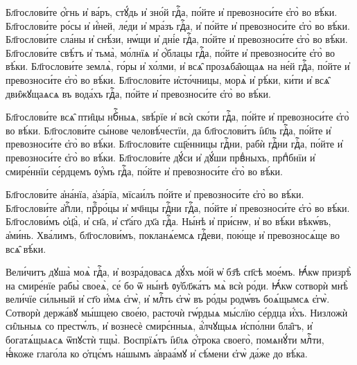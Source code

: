\hKv Бл҃гослови́те ѻ҆́гнь и҆ ва́ръ, стꙋ́дь и҆  зно́й гдⷭ҇а, по́йте и҆ превозноси́те є҆го̀ во вѣ́ки. 
\hKv  Бл҃гослови́те ро́сы и҆ и҆́ней, ле́ди и҆ мра́зъ гдⷭ҇а, и҆  по́йте и҆ превозноси́те є҆го̀ во вѣ́ки. 
\hKv Бл҃гослови́те  сла́ны и҆ снѣ́зи, нѡ́щи и҆ дні́е гдⷭ҇а, по́йте и҆  превозноси́те є҆го̀ во вѣ́ки. 
\hKv Бл҃гослови́те свѣ́тъ  и҆ тьма̀, мо́лнїѧ и҆ ѻ҆́блацы гдⷭ҇а, по́йте и҆  превозноси́те є҆го̀ во вѣ́ки. 
\hKv Бл҃гослови́те землѧ̀,  го́ры и҆ хо́лми, и҆ всѧ̑   прозѧба̑ющаѧ на не́й гдⷭ҇а, по́йте и҆ превозноси́те є҆го̀  во вѣ́ки. 
\hKv Бл҃гослови́те и҆сто́чницы, морѧ̀ и҆  рѣ́ки, ки́ти и҆ всѧ̑ дви̑жꙋщаѧсѧ въ вода́хъ гдⷭ҇а, по́йте  и҆ превозноси́те є҆го̀ во вѣ́ки. 
%

\hKv Бл҃гослови́те всѧ̑ пти̑цы нбⷭ҇ныѧ, ѕвѣ́рїе и҆  всѝ ско́ти гдⷭ҇а, по́йте и҆ превозноси́те є҆го̀ во вѣ́ки.  
\hKv Бл҃гослови́те сы́нове человѣ́честїи, да  бл҃гослови́тъ і҆и҃ль гдⷭ҇а, по́йте и҆ превозноси́те є҆го̀  во вѣ́ки. 
\hKv Бл҃гослови́те сщ҃е́нницы гдⷭ҇ни, рабѝ  гдⷭ҇ни гдⷭ҇а, по́йте и҆ превозноси́те є҆го̀ во вѣ́ки.  
\hKv Бл҃гослови́те дꙋ́си и҆ дꙋ́ши првⷣныхъ, прпⷣбнїи и҆  смире́ннїи се́рдцемъ ᲂу҆́мъ гдⷭ҇а, по́йте и҆ превозноси́те  є҆го̀ во вѣ́ки.  
%

\hKv Бл҃гослови́те а҆на́нїа, а҆за́рїа, мїсаи́лъ  по́йте и҆ превозноси́те є҆го̀ во вѣ́ки. 
\hKv  Бл҃гослови́те а҆пⷭ҇ли, прⷪ҇ро́цы и҆ мч҃нцы гдⷭ҇ни гдⷭ҇а,  по́йте и҆ превозноси́те є҆го̀ во вѣ́ки. 
\hKv  Бл҃гослови́мъ ѻ҆ц҃а̀, и҆ сн҃а, и҆ ст҃а́го дх҃а гдⷭ҇а.  
\hKv Ны́нѣ и҆ при́снѡ, и҆ во вѣ́ки вѣкѡ́въ, а҆ми́нь.   
\hKv Хва́лимъ, бл҃гослови́мъ, покланѧ́емсѧ гдⷭ҇еви, пою́ще и҆  превозносѧ́ще во всѧ̑ вѣ́ки.  
%

\cuLettrine
Вели́читъ дꙋша̀ моѧ̀ гдⷭ҇а, и҆ возра́довасѧ дꙋ́хъ  мо́й ѡ҆ бз҃ѣ сп҃сѣ мое́мъ. 
\hKv Ꙗ҆́кѡ призрѣ̀ на  смире́нїе рабы̀ своеѧ̀, се́ бо ѿ ны́нѣ ᲂу҆бл҃жа́тъ мѧ̀  всѝ ро́ди. 
\hKv Ꙗ҆́кѡ сотворѝ мнѣ̀ вели́чїе си́льный и҆  ст҃о и҆́мѧ є҆гѡ̀, и҆ млⷭ҇ть є҆гѡ̀ въ ро́ды родѡ́въ  боѧ́щымсѧ є҆гѡ̀. 
\hKv Сотворѝ держа́вꙋ мы́шцею свое́ю,  расточѝ гѡ́рдыѧ мы́слїю се́рдца и҆́хъ. 
\hKv Низложѝ  си̑льныѧ со престѡ́лъ, и҆ вознесѐ смирє́нныѧ, а҆́лчꙋщыѧ  и҆спо́лни бла̑гъ, и҆ богатѧ́щыѧсѧ ѿпꙋстѝ тщы̀. 
\hKv Воспрїѧ́тъ і҆и҃лѧ ѻ҆́трока своего̀, помѧнꙋ́ти млⷭ҇ти,  ꙗ҆́коже глаго́ла ко ѻ҆тцє́мъ на́шымъ а҆враа́мꙋ и҆  сѣ́мени є҆гѡ̀ да́же до вѣ́ка. 

